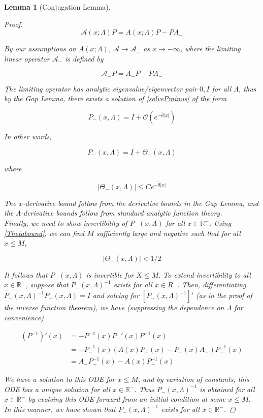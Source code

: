 \documentclass[12pt]{article}
\def\R{{\mathbb R}}
\newtheorem{lemma}{Lemma}
\begin{document}
\begin{lemma}[Conjugation Lemma]
\begin{proof}
\[
\mathcal{A}(x; \Lambda) P = A(x; \Lambda) P - P A_-
\]

By our assumptions on $A(x; \Lambda)$, $\mathcal{A} \rightarrow \mathcal{A}_-$ as $x \rightarrow -\infty$, where the limiting linear operator $\mathcal{A}_-$ is defined by

\[
\mathcal{A}_- P = A_- P - P A_-
\]

The limiting operator has analytic eigenvalue/eigenvector pair $0, I$ for all $\Lambda$, thus by the Gap Lemma, there exists a solution of \eqref{solvePminus} of the form 

\begin{equation}
P_-(x, \Lambda) = I + \mathcal{O}(e^{-\tilde{\theta}|x|})
\end{equation}

In other words, 

\begin{equation}
P_-(x, \Lambda) = I + \Theta_-(x, \Lambda)
\end{equation}

where 

\begin{equation}\label{Thetabound}
|\Theta_-(x, \Lambda)| \leq C e^{-\tilde{\theta}|x|}
\end{equation}

The $x$-derivative bound follow from the derivative bounds in the Gap Lemma, and the $\Lambda$-derivative bounds follow from standard analytic function theory.\\

Finally, we need to show invertibility of $P_-(x, \Lambda)$ for all $x \in \R^-$. Using \eqref{Thetabound}, we can find $M$ sufficiently large and negative such that for all $x \leq M$,

\[
|\Theta_-(x, \Lambda)| < 1/2
\]

It follows that $P_-(x, \Lambda)$ is invertible for $X \leq M$. To extend invertibility to all $x \in \R^-$, suppose that $P_-(x, \Lambda)^{-1}$ exists for all $x \in R^-$. Then, differentiating $P_-(x, \Lambda)^{-1} P_-(x, \Lambda) = I$ and solving for $[P_-(x, \Lambda)^{-1}]'$ (as in the proof of the inverse function theorem), we have (suppressing the dependence on $\Lambda$ for convenience)

\begin{align*}
(P_-^{-1})'(x) &= -P_-^{-1}(x)P_-'(x)P_-^{-1}(x) \\
&= -P_-^{-1}(x)( A(x)P_-(x) - P_-(x) A_-)P_-^{-1}(x) \\
&= A_- P_-^{-1}(x) - A(x) P_-^{-1}(x)
\end{align*}

We have a solution to this ODE for $x \leq M$, and by variation of constants, this ODE has a unique solution for all $x \in \R^-$. Thus $P_-(x, \Lambda)^{-1}$ is obtained for all $x \in \R^-$ by evolving this ODE forward from an initial condition at some $x \leq M$. In this manner, we have shown that $P_-(x, \Lambda)^{-1}$ exists for all $x \in \R^-$.

\end{proof}
\end{lemma}
\end{document}
